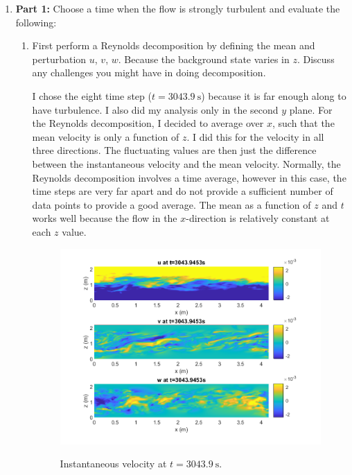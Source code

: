 \documentclass[12pt]{article}
\begin{document}
	
	\begin{enumerate}
		\item \textbf{Part 1:} Choose a time when the flow is strongly turbulent and evaluate the following:
		\begin{enumerate}
			\item First perform a Reynolds decomposition by defining the mean and perturbation $u$, $v$, $w$. Because the background state varies in $z$. Discuss any challenges you might have in doing decomposition.\par
			
			I chose the eight time step ($t=\SI{3043.9}{\second}$) because it is far enough along to have turbulence. I also did my analysis only in the second $y$ plane. For the Reynolds decomposition, I decided to average over $x$, such that the mean velocity is only a function of $z$. I did this for the velocity in all three directions. The fluctuating values are then just the difference between the instantaneous velocity and the mean velocity. Normally, the Reynolds decomposition involves a time average, however in this case, the time steps are very far apart and do not provide a sufficient number of data points to provide a good average. The mean as a function of $z$ and $t$ works well because the flow in the $x$-direction is relatively constant at each $z$ value.
			
			
			\begin{figure}[htbp]
				\centering
				\includegraphics[width=\textwidth]{1-plots/Vel_plot_3043.png}
				\label{fig:Vel 3043}
				\caption{Instantaneous velocity at $t=\SI{3043.9}{\second}$.}
			\end{figure}
		

\end{enumerate}
\end{enumerate}
\end{document}
